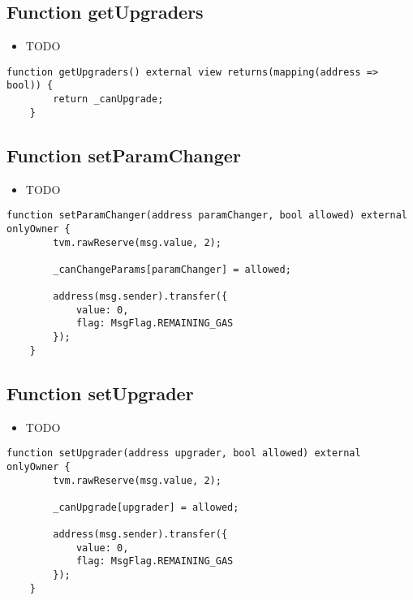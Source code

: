 \subsection{Function getUpgraders}

\noindent\begin{itemize}
\item TODO
\end{itemize}

\begin{lstlisting}[firstnumber=54]
    function getUpgraders() external view returns(mapping(address => bool)) {
        return _canUpgrade;
    }
\end{lstlisting}

\subsection{Function setParamChanger}

\noindent\begin{itemize}
\item TODO
\end{itemize}

\begin{lstlisting}[firstnumber=28]
    function setParamChanger(address paramChanger, bool allowed) external onlyOwner {
        tvm.rawReserve(msg.value, 2);

        _canChangeParams[paramChanger] = allowed;

        address(msg.sender).transfer({
            value: 0,
            flag: MsgFlag.REMAINING_GAS
        });
    }
\end{lstlisting}

\subsection{Function setUpgrader}

\noindent\begin{itemize}
\item TODO
\end{itemize}

\begin{lstlisting}[firstnumber=17]
    function setUpgrader(address upgrader, bool allowed) external onlyOwner {
        tvm.rawReserve(msg.value, 2);

        _canUpgrade[upgrader] = allowed;

        address(msg.sender).transfer({
            value: 0,
            flag: MsgFlag.REMAINING_GAS
        });
    }
\end{lstlisting}
